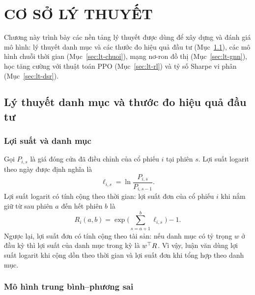 \chapter{CƠ SỞ LÝ THUYẾT}
\label{ch:lythuyet}

Chương này trình bày các nền tảng lý thuyết được dùng để xây dựng và đánh giá mô hình: lý thuyết danh mục và các thước đo hiệu quả đầu tư (Mục~\ref{sec:lt-danhmuc}), các mô hình chuỗi thời gian (Mục~\ref{sec:lt-chuoi}), mạng nơ-ron đồ thị (Mục~\ref{sec:lt-gnn}), học tăng cường với thuật toán PPO (Mục~\ref{sec:lt-rl}) và tỷ số Sharpe vi phân (Mục~\ref{sec:lt-dsr}).

\section{Lý thuyết danh mục và thước đo hiệu quả đầu tư}
\label{sec:lt-danhmuc}

\subsection{Lợi suất và danh mục}

Gọi $P_{i,s}$ là giá đóng cửa đã điều chỉnh của cổ phiếu $i$ tại phiên $s$. Lợi suất logarit theo ngày được định nghĩa là
\begin{equation}
\ell_{i,s}=\ln\frac{P_{i,s}}{P_{i,s-1}}.
\label{eq:logret}
\end{equation}
Lợi suất logarit có tính cộng theo thời gian: lợi suất đơn của cổ phiếu $i$ khi nắm giữ từ sau phiên $a$ đến hết phiên $b$ là
\begin{equation}
R_i(a,b)=\exp\Big(\sum_{s=a+1}^{b}\ell_{i,s}\Big)-1 .
\label{eq:holdret}
\end{equation}
Ngược lại, lợi suất đơn có tính cộng theo tài sản: nếu danh mục có tỷ trọng $w$ ở đầu kỳ thì lợi suất của danh mục trong kỳ là $w^{\top} R$. Vì vậy, luận văn dùng lợi suất logarit khi cộng dồn theo thời gian và lợi suất đơn khi tổng hợp theo danh mục.

\subsection{Mô hình trung bình--phương sai}

